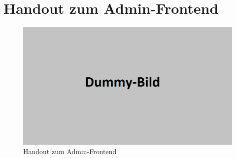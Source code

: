 \section{Handout zum Admin-Frontend}
\label{sec: Handout zum Admin-Frontend}


\begin{figure}[H]
	\begin{center}
	\includegraphics[width=0.65 \textwidth]{./pics/dummy.png}
	\end{center}
	\caption{Handout zum Admin-Frontend}
	\label{pic: Handout zum Admin-Frontend}
\end{figure}

